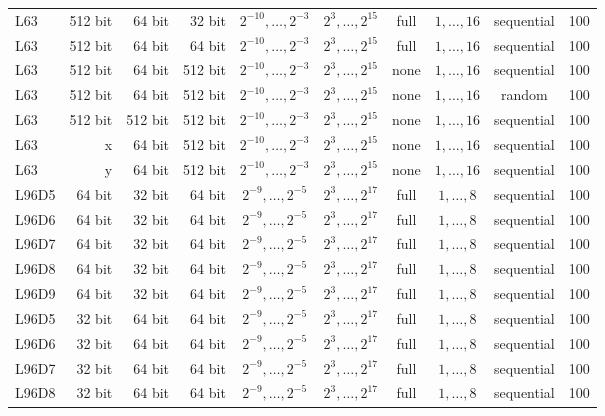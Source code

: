 \documentclass{article}
\begin{document}
\begin{table}[b!]
\begin{center}
\begin{tabular}{lrrrcccccc}
			L63 & 512 bit & 64 bit & 32 bit & $2^{-10}, \dots, 2^{-3}$ & $2^3, \dots, 2^{15}$ & full & $1, \dots, 16$ & sequential & 100\\
			L63 & 512 bit & 64 bit & 64 bit & $2^{-10}, \dots, 2^{-3}$ & $2^3, \dots, 2^{15}$ & full & $1, \dots, 16$ & sequential & 100\\
			L63 & 512 bit & 64 bit & 512 bit & $2^{-10}, \dots, 2^{-3}$ & $2^3, \dots, 2^{15}$ & none & $1, \dots, 16$ & sequential & 100\\
			L63 & 512 bit & 64 bit & 512 bit & $2^{-10}, \dots, 2^{-3}$ & $2^3, \dots, 2^{15}$ & none & $1, \dots, 16$ & random & 100\\
			L63 & 512 bit & 512 bit & 512 bit & $2^{-10}, \dots, 2^{-3}$ & $2^3, \dots, 2^{15}$ & none & $1, \dots, 16$ & sequential & 100\\
			L63 & x & 64 bit & 512 bit & $2^{-10}, \dots, 2^{-3}$ & $2^3, \dots, 2^{15}$ & none & $1, \dots, 16$ & sequential & 100\\
			L63 & y & 64 bit & 512 bit & $2^{-10}, \dots, 2^{-3}$ & $2^3, \dots, 2^{15}$ & none & $1, \dots, 16$ & sequential & 100\\
			L96D5 & 64 bit & 32 bit & 64 bit & $2^{-9}, \dots, 2^{-5}$ & $2^3, \dots, 2^{17}$ & full & $1, \dots, 8$ & sequential & 100\\
			L96D6 & 64 bit & 32 bit & 64 bit & $2^{-9}, \dots, 2^{-5}$ & $2^3, \dots, 2^{17}$ & full & $1, \dots, 8$ & sequential & 100\\
			L96D7 & 64 bit & 32 bit & 64 bit & $2^{-9}, \dots, 2^{-5}$ & $2^3, \dots, 2^{17}$ & full & $1, \dots, 8$ & sequential & 100\\
			L96D8 & 64 bit & 32 bit & 64 bit & $2^{-9}, \dots, 2^{-5}$ & $2^3, \dots, 2^{17}$ & full & $1, \dots, 8$ & sequential & 100\\
			L96D9 & 64 bit & 32 bit & 64 bit & $2^{-9}, \dots, 2^{-5}$ & $2^3, \dots, 2^{17}$ & full & $1, \dots, 8$ & sequential & 100\\
			L96D5 & 32 bit & 64 bit & 64 bit & $2^{-9}, \dots, 2^{-5}$ & $2^3, \dots, 2^{17}$ & full & $1, \dots, 8$ & sequential & 100\\
			L96D6 & 32 bit & 64 bit & 64 bit & $2^{-9}, \dots, 2^{-5}$ & $2^3, \dots, 2^{17}$ & full & $1, \dots, 8$ & sequential & 100\\
			L96D7 & 32 bit & 64 bit & 64 bit & $2^{-9}, \dots, 2^{-5}$ & $2^3, \dots, 2^{17}$ & full & $1, \dots, 8$ & sequential & 100\\
			L96D8 & 32 bit & 64 bit & 64 bit & $2^{-9}, \dots, 2^{-5}$ & $2^3, \dots, 2^{17}$ & full & $1, \dots, 8$ & sequential & 100\\

\end{tabular}
\end{center}
\end{table}
\end{document}
